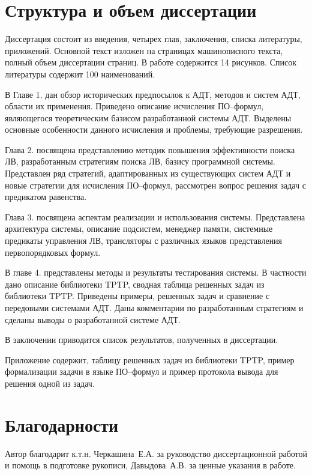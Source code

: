 \section*{Структура и объем диссертации}
Диссертация состоит из введения, четырех глав, заключения, списка литературы, приложений. Основной текст изложен на \pageref{pg:main} страницах машинописного текста, полный объем диссертации \pageref{pg:total} страниц. В работе содержится 14 рисунков. Список литературы содержит 100 наименований.

В Главе 1. дан обзор исторических предпосылок к АДТ, методов и систем АДТ, области их применения. Приведено описание исчисления ПО--формул, являющегося теоретическим базисом разработанной системы АДТ. Выделены основные особенности данного исчисления и проблемы, требующие разрешения.

Глава 2. посвящена представлению методик повышения эффективности поиска ЛВ, разработанным стратегиям поиска ЛВ, базису программной системы. Представлен ряд стратегий, адаптированных из существующих систем АДТ и новые стратегии для исчисления ПО--формул, рассмотрен вопрос решения задач с предикатом равенства.

Глава 3. посвящена аспектам реализации и использования системы. Представлена архитектура системы, описание подсистем, менеджер памяти, системные предикаты управления ЛВ, трансляторы с различных языков представления первопорядковых формул.

В главе 4. представлены методы и результаты тестирования системы. В частности дано описание библиотеки TPTP, сводная таблица решенных задач из библиотеки TPTP. Приведены примеры, решенных задач и сравнение с передовыми системами АДТ. Даны комментарии по разработанным стратегиям и сделаны выводы о разработанной системе АДТ. %

В заключении приводится список результатов, полученных в диссертации. %

Приложение содержит, таблицу решенных задач из библиотеки TPTP, пример формализации задачи в языке ПО--формул и пример протокола вывода для решения одной из задач.



\section*{Благодарности}
Автор благодарит к.т.н. Черкашина~Е.А. за руководство диссертационной работой и помощь в подготовке рукописи, Давыдова~А.В. за ценные указания в работе.


